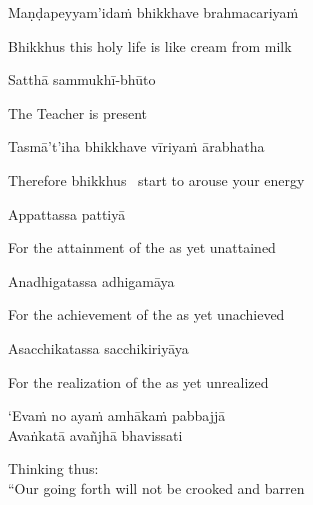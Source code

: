 Maṇḍapeyyam'idaṁ bhikkhave brahmacariyaṁ

\begin{english}
  Bhikkhus this holy life is like cream from milk\ifdigitalversion\makeatletter\hyperlink{endnote89-appendix}\makeatother\fi
\end{english}

Satthā sammukhī-bhūto

\begin{english}
  The Teacher is present
\end{english}

Tasmā't'iha bhikkhave vīriyaṁ ārabhatha

\begin{english}
  Therefore bhikkhus \breathmark\ start to arouse your energy
\end{english}

Appattassa pattiyā

\begin{english}
  For the attainment of the as yet unattained
\end{english}

Anadhigatassa adhigamāya

\begin{english}
  For the achievement of the as yet unachieved
\end{english}

Asacchikatassa sacchikiriyāya

\begin{english}
  For the realization of the as yet unrealized
\end{english}

`Evaṁ no ayaṁ amhākaṁ pabbajjā\\
Avaṅkatā avañjhā\ifdigitalversion\makeatletter\hyperlink{endnote90-appendix}\makeatother \thinspace\fi
bhavissati

\begin{english}
  Thinking thus:\\
  ``Our going forth will not be crooked and barren\ifdigitalversion\makeatletter\hyperlink{endnote91-appendix}\makeatother\fi
\end{english}


